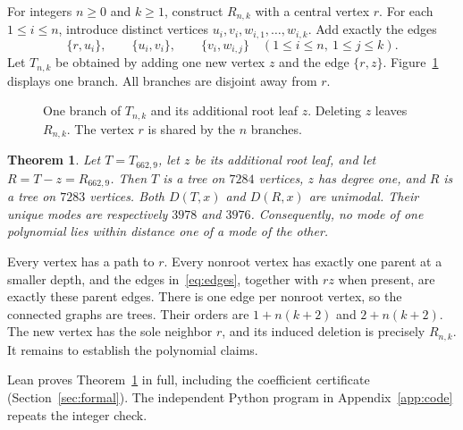 \documentclass[11pt]{article}
\newtheorem{theorem}{Theorem}
\newcommand{\D}{D}
\begin{document}
For integers $n\ge0$ and $k\ge1$, construct $R_{n,k}$ with a central vertex $r$. For each $1\le i\le n$, introduce distinct vertices $u_i,v_i,w_{i,1},\ldots,w_{i,k}$. Add exactly the edges
\begin{equation}\label{eq:edges}
 \{r,u_i\},\qquad \{u_i,v_i\},\qquad
 \{v_i,w_{i,j}\}\quad(1\le i\le n,\ 1\le j\le k).
\end{equation}
Let $T_{n,k}$ be obtained by adding one new vertex $z$ and the edge $\{r,z\}$. Figure~\ref{fig:branch} displays one branch. All branches are disjoint away from $r$.

\begin{figure}[ht]
\centering
{}
\caption{One branch of $T_{n,k}$ and its additional root leaf $z$. Deleting $z$ leaves $R_{n,k}$. The vertex $r$ is shared by the $n$ branches.}\label{fig:branch}
\end{figure}

\begin{theorem}\label{thm:main}
Let $T=T_{662,9}$, let $z$ be its additional root leaf, and let $R=T-z=R_{662,9}$. Then $T$ is a tree on $7284$ vertices, $z$ has degree one, and $R$ is a tree on $7283$ vertices. Both $\D(T,x)$ and $\D(R,x)$ are unimodal. Their unique modes are respectively $3978$ and $3976$. Consequently, no mode of one polynomial lies within distance one of a mode of the other.
\end{theorem}

Every vertex has a path to $r$. Every nonroot vertex has exactly one parent at a smaller depth, and the edges in~\eqref{eq:edges}, together with $rz$ when present, are exactly these parent edges. There is one edge per nonroot vertex, so the connected graphs are trees. Their orders are $1+n(k+2)$ and $2+n(k+2)$. The new vertex has the sole neighbor $r$, and its induced deletion is precisely $R_{n,k}$. It remains to establish the polynomial claims.

Lean proves Theorem~\ref{thm:main} in full, including the coefficient certificate (Section~\ref{sec:formal}). The independent Python program in Appendix~\ref{app:code} repeats the integer check.
\end{document}
